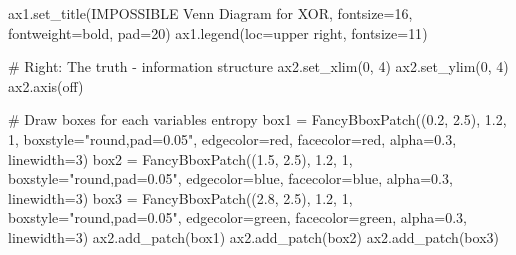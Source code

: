 \documentclass[
  11pt,
  letterpaper,
  oneside,
  openany]{book}
\newenvironment{Shaded}{\begin{snugshade}}{\end{snugshade}}
\newcommand{\CommentTok}[1]{\textcolor[rgb]{0.37,0.37,0.37}{#1}}
\newcommand{\DecValTok}[1]{\textcolor[rgb]{0.68,0.00,0.00}{#1}}
\newcommand{\FloatTok}[1]{\textcolor[rgb]{0.68,0.00,0.00}{#1}}
\newcommand{\NormalTok}[1]{\textcolor[rgb]{0.00,0.23,0.31}{#1}}
\newcommand{\OperatorTok}[1]{\textcolor[rgb]{0.37,0.37,0.37}{#1}}
\newcommand{\StringTok}[1]{\textcolor[rgb]{0.13,0.47,0.30}{#1}}
\begin{document}
\begin{Shaded}
\begin{Highlighting}[]
\NormalTok{ax1.set\_title(}\StringTok{\textquotesingle{}IMPOSSIBLE Venn Diagram for XOR\textquotesingle{}}\NormalTok{, fontsize}\OperatorTok{=}\DecValTok{16}\NormalTok{, fontweight}\OperatorTok{=}\StringTok{\textquotesingle{}bold\textquotesingle{}}\NormalTok{, pad}\OperatorTok{=}\DecValTok{20}\NormalTok{)}
\NormalTok{ax1.legend(loc}\OperatorTok{=}\StringTok{\textquotesingle{}upper right\textquotesingle{}}\NormalTok{, fontsize}\OperatorTok{=}\DecValTok{11}\NormalTok{)}

\CommentTok{\# Right: The truth {-} information structure}
\NormalTok{ax2.set\_xlim(}\DecValTok{0}\NormalTok{, }\DecValTok{4}\NormalTok{)}
\NormalTok{ax2.set\_ylim(}\DecValTok{0}\NormalTok{, }\DecValTok{4}\NormalTok{)}
\NormalTok{ax2.axis(}\StringTok{\textquotesingle{}off\textquotesingle{}}\NormalTok{)}

\CommentTok{\# Draw boxes for each variable\textquotesingle{}s entropy}
\NormalTok{box1 }\OperatorTok{=}\NormalTok{ FancyBboxPatch((}\FloatTok{0.2}\NormalTok{, }\FloatTok{2.5}\NormalTok{), }\FloatTok{1.2}\NormalTok{, }\DecValTok{1}\NormalTok{, boxstyle}\OperatorTok{=}\StringTok{"round,pad=0.05"}\NormalTok{, }
\NormalTok{                       edgecolor}\OperatorTok{=}\StringTok{\textquotesingle{}red\textquotesingle{}}\NormalTok{, facecolor}\OperatorTok{=}\StringTok{\textquotesingle{}red\textquotesingle{}}\NormalTok{, alpha}\OperatorTok{=}\FloatTok{0.3}\NormalTok{, linewidth}\OperatorTok{=}\DecValTok{3}\NormalTok{)}
\NormalTok{box2 }\OperatorTok{=}\NormalTok{ FancyBboxPatch((}\FloatTok{1.5}\NormalTok{, }\FloatTok{2.5}\NormalTok{), }\FloatTok{1.2}\NormalTok{, }\DecValTok{1}\NormalTok{, boxstyle}\OperatorTok{=}\StringTok{"round,pad=0.05"}\NormalTok{,}
\NormalTok{                       edgecolor}\OperatorTok{=}\StringTok{\textquotesingle{}blue\textquotesingle{}}\NormalTok{, facecolor}\OperatorTok{=}\StringTok{\textquotesingle{}blue\textquotesingle{}}\NormalTok{, alpha}\OperatorTok{=}\FloatTok{0.3}\NormalTok{, linewidth}\OperatorTok{=}\DecValTok{3}\NormalTok{)}
\NormalTok{box3 }\OperatorTok{=}\NormalTok{ FancyBboxPatch((}\FloatTok{2.8}\NormalTok{, }\FloatTok{2.5}\NormalTok{), }\FloatTok{1.2}\NormalTok{, }\DecValTok{1}\NormalTok{, boxstyle}\OperatorTok{=}\StringTok{"round,pad=0.05"}\NormalTok{,}
\NormalTok{                       edgecolor}\OperatorTok{=}\StringTok{\textquotesingle{}green\textquotesingle{}}\NormalTok{, facecolor}\OperatorTok{=}\StringTok{\textquotesingle{}green\textquotesingle{}}\NormalTok{, alpha}\OperatorTok{=}\FloatTok{0.3}\NormalTok{, linewidth}\OperatorTok{=}\DecValTok{3}\NormalTok{)}
\NormalTok{ax2.add\_patch(box1)}
\NormalTok{ax2.add\_patch(box2)}
\NormalTok{ax2.add\_patch(box3)}


\end{Highlighting}
\end{Shaded}
\end{document}
